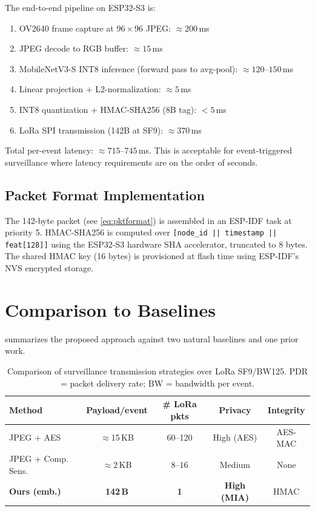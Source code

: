 \documentclass[journal]{IEEEtran}
\newcommand{\MN}{MobileNetV3-S\xspace}
\begin{document}
The end-to-end pipeline on ESP32-S3 is:
\begin{enumerate}
  \item OV2640 frame capture at $96 \times 96$ JPEG: $\approx 200$\,ms
  \item JPEG decode to RGB buffer: $\approx 15$\,ms
  \item \MN INT8 inference (forward pass to avg-pool): $\approx 120$--$150$\,ms
  \item Linear projection + L2-normalization: $\approx 5$\,ms
  \item INT8 quantization + HMAC-SHA256 (8B tag): $< 5$\,ms
  \item LoRa SPI transmission (142B at SF9): $\approx 370$\,ms
\end{enumerate}
Total per-event latency: $\approx 715$--$745$\,ms.
This is acceptable for event-triggered surveillance where latency
requirements are on the order of seconds.

\subsection{Packet Format Implementation}

The 142-byte packet (see \cref{eq:pktformat}) is assembled in an
ESP-IDF task at priority 5.
HMAC-SHA256 is computed over \texttt{[node\_id || timestamp || feat[128]]}
using the ESP32-S3 hardware SHA accelerator, truncated to 8 bytes.
The shared HMAC key (16 bytes) is provisioned at flash time using
ESP-IDF's NVS encrypted storage.

\section{Comparison to Baselines}
\label{sec:comparison}

 summarizes the proposed approach
against two natural baselines and one prior work.

\begin{table}[tb]
  \centering
  \caption{Comparison of surveillance transmission strategies over LoRa SF9/BW125.
           PDR = packet delivery rate; BW = bandwidth per event.}
  \label{tab:baseline_comparison}
  \begin{tabular}{@{}lcccc@{}}
    \toprule
    Method & Payload/event & \# LoRa pkts & Privacy & Integrity \\
    \midrule
    JPEG + AES        & $\approx$15\,KB & 60--120 & High (AES) & AES-MAC \\
    JPEG + Comp. Sens.& $\approx$2\,KB  & 8--16   & Medium     & None \\
    \textbf{Ours (emb.)} & \textbf{142\,B} & \textbf{1} & \textbf{High (MIA)} & HMAC \\
    \bottomrule
  \end{tabular}
\end{table}
\end{document}
